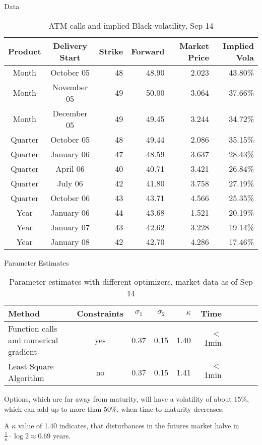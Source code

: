 {Data}
{\small \begin{table}[btp]
\begin{center}
\begin{tabular}{ccrrrr}
Product     & Delivery Start    & Strike    &   Forward & Market Price  &Implied Vola \\
\hline
Month   &October 05     &48 &48.90&2.023&43.80\%\\
Month   &November 05        &49 &50.00&3.064&37.66\%\\
Month   &December 05        &49 &49.45&3.244&34.72\%\\
\hline
Quarter & October 05        &48 &49.44&2.086&35.15\%\\
Quarter & January 06        &47 &48.59&3.637&28.43\%\\
Quarter & April 06          &40 &40.71&3.421&26.84\%\\
Quarter & July 06           &42 &41.80&3.758&27.19\%\\
Quarter & October 06        &43 &43.71&4.566&25.35\%\\
\hline
Year    &January 06     &44 &43.68&1.521&20.19\%\\
Year    &January 07     &43 &42.62&3.228&19.14\%\\
Year    &January 08     &42 &42.70&4.286&17.46\%\\
\end{tabular}
\caption{ATM calls and implied Black-volatility, Sep 14}
\label{fig:data}
\end{center}
\end{table}
}

{Parameter Estimates}
 \begin{table}[btp]
 \begin{center}
\begin{tabular}{p{4cm}cccrrrrcc}
Method  &Constraints    &$\sigma_1$ &$\sigma_2$ &$\kappa$   &Time&\\
\hline
Function calls and numerical gradient       &yes            &0.37       &0.15       &1.40       &$<$1min&\\
Least Square Algorithm  &no&0.37&0.15&1.41      &$<$1min&\\
\end{tabular}
\caption{Parameter estimates with different optimizers, market data as of Sep 14}
\label{fig:estimates18}
\end{center}
\end{table}

Options, which are far away from maturity, will have a volatility of about $15\%$,
which can add up to more than $50\%$, when time to maturity decreases.

A $\kappa$ value of 1.40 indicates, that disturbances in the futures market
halve in $\frac{1}{\kappa}\cdot \log 2 \approx 0.69$ years.













